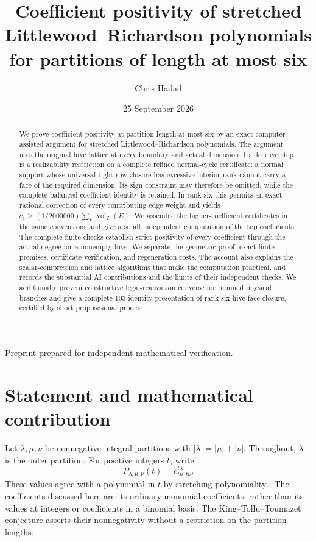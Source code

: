 \documentclass[11pt]{article}
\title{Coefficient positivity of stretched Littlewood--Richardson polynomials\\
for partitions of length at most six}
\author{Chris Hadad}
\date{25 September 2026}
\theoremstyle{definition}\newtheorem{definition}[theorem]{Definition}
\theoremstyle{remark}\newtheorem{remark}[theorem]{Remark}
\newcommand{\Z}{\mathbb Z}\newcommand{\Q}{\mathbb Q}\newcommand{\R}{\mathbb R}
\newcommand{\vol}{\operatorname{vol}_{\Z}}
\begin{document}
\maketitle
\begin{center}\small
Preprint prepared for independent mathematical verification.
\end{center}
\begin{abstract}
\setlength{\emergencystretch}{1em}
We prove coefficient positivity at partition length at most six by an exact
computer-assisted argument for stretched Littlewood--\allowbreak Richardson
polynomials. The argument uses the original hive lattice at every boundary and actual
dimension. Its decisive step is a realizability restriction on a complete
refined normal-cycle certificate: a normal support whose universal tight-row
closure has excessive interior rank cannot carry a face of the required
dimension. Its sign constraint may therefore be omitted, while the complete
balanced coefficient identity is retained. In rank six this permits an exact
rational correction of every contributing edge weight and yields
\(c_1\geq (1/2000000)\sum_E\vol(E)\).
We assemble the higher-coefficient certificates in the same conventions and
give a small independent computation of the top coefficients. The complete
finite checks establish strict positivity of every coefficient through the
actual degree for a nonempty hive. We separate the geometric
proof, exact finite premises, certificate verification, and regeneration costs.
The account also explains the scalar-compression and lattice algorithms that
make the computation practical, and records the substantial AI contributions
and the limits of their independent checks.
We additionally prove a constructive legal-realization converse for retained
physical branches and give a complete 103-identity presentation of rank-six
hive-face closure, certified by short propositional proofs.
\end{abstract}
\tableofcontents

\section{Statement and mathematical contribution}
Let \(\lambda,\mu,\nu\) be nonnegative integral partitions with
\(|\lambda|=|\mu|+|\nu|\). Throughout, \(\lambda\) is the outer partition.
For positive integers \(t\), write
\[
 P_{\lambda,\mu,\nu}(t)=c^{t\lambda}_{t\mu,t\nu}.
\]
These values agree with a polynomial in \(t\) by stretching polynomiality
\cite{rassart}. The coefficients discussed here are its ordinary monomial
coefficients, rather than its values at integers or coefficients in a binomial
basis. The King--Tollu--Toumazet conjecture \cite{ktt} asserts their nonnegativity without
a restriction on the partition lengths.
\end{document}
